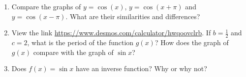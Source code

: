 \documentclass[11pt,dvipsnames]{article}
\begin{document}
\thispagestyle{empty}
\begin{enumerate}[label=$\blacktriangleright$ {\bf  \arabic*:}]
\item Compare the graphs of $\displaystyle y=\cos (x )$, $\displaystyle y=\cos (x+\pi )$ and $\displaystyle y=\cos (x-\pi )$. What are their similarities and differences?
\item View the link \url{https://www.desmos.com/calculator/hwqoovclrb}. If $\displaystyle b=\frac{1}{2}$ and $c=2$, what is the period of the function $g(x)$? How does the graph of $g(x)$ compare with the graph of $\sin x$?
\item Does $f(x)=\sin x$ have an inverse function? Why or why not?
\end{enumerate}
\end{document}
